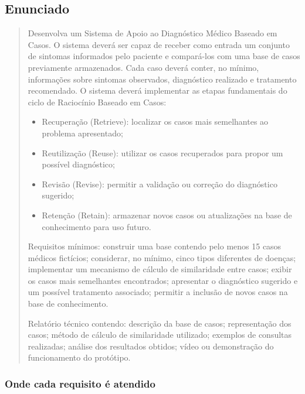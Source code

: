 \documentclass[12pt, a4paper]{article}
\providecommand{\tightlist}{%
  \setlength{\itemsep}{0pt}\setlength{\parskip}{0pt}}
\begin{document}
\subsection{Enunciado}\label{enunciado}

\begin{quote}
Desenvolva um Sistema de Apoio ao Diagnóstico Médico Baseado em Casos. O sistema deverá ser capaz de receber como entrada um conjunto de sintomas informados pelo paciente e compará-los com uma base de casos previamente armazenados. Cada caso deverá conter, no mínimo, informações sobre sintomas observados, diagnóstico realizado e tratamento recomendado. O sistema deverá implementar as etapas fundamentais do ciclo de Raciocínio Baseado em Casos:

\begin{itemize}
\tightlist
\item
  Recuperação (Retrieve): localizar os casos mais semelhantes ao problema apresentado;
\item
  Reutilização (Reuse): utilizar os casos recuperados para propor um possível diagnóstico;
\item
  Revisão (Revise): permitir a validação ou correção do diagnóstico sugerido;
\item
  Retenção (Retain): armazenar novos casos ou atualizações na base de conhecimento para uso futuro.
\end{itemize}

Requisitos mínimos: construir uma base contendo pelo menos 15 casos médicos fictícios; considerar, no mínimo, cinco tipos diferentes de doenças; implementar um mecanismo de cálculo de similaridade entre casos; exibir os casos mais semelhantes encontrados; apresentar o diagnóstico sugerido e um possível tratamento associado; permitir a inclusão de novos casos na base de conhecimento.

Relatório técnico contendo: descrição da base de casos; representação dos casos; método de cálculo de similaridade utilizado; exemplos de consultas realizadas; análise dos resultados obtidos; vídeo ou demonstração do funcionamento do protótipo.
\end{quote}

\subsubsection{Onde cada requisito é atendido}\label{onde-cada-requisito-uxe9-atendido}
\end{document}
